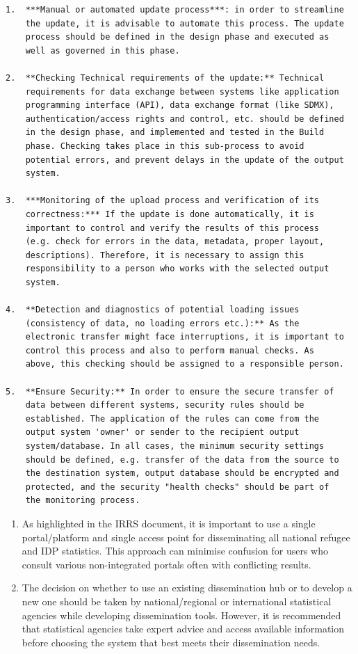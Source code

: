 \documentclass[
]{article}
\begin{document}
\begin{verbatim}
1.  ***Manual or automated update process***: in order to streamline
    the update, it is advisable to automate this process. The update
    process should be defined in the design phase and executed as
    well as governed in this phase.

2.  **Checking Technical requirements of the update:** Technical
    requirements for data exchange between systems like application
    programming interface (API), data exchange format (like SDMX),
    authentication/access rights and control, etc. should be defined
    in the design phase, and implemented and tested in the Build
    phase. Checking takes place in this sub-process to avoid
    potential errors, and prevent delays in the update of the output
    system.

3.  ***Monitoring of the upload process and verification of its
    correctness:*** If the update is done automatically, it is
    important to control and verify the results of this process
    (e.g. check for errors in the data, metadata, proper layout,
    descriptions). Therefore, it is necessary to assign this
    responsibility to a person who works with the selected output
    system.

4.  **Detection and diagnostics of potential loading issues
    (consistency of data, no loading errors etc.):** As the
    electronic transfer might face interruptions, it is important to
    control this process and also to perform manual checks. As
    above, this checking should be assigned to a responsible person.

5.  **Ensure Security:** In order to ensure the secure transfer of
    data between different systems, security rules should be
    established. The application of the rules can come from the
    output system 'owner' or sender to the recipient output
    system/database. In all cases, the minimum security settings
    should be defined, e.g. transfer of the data from the source to
    the destination system, output database should be encrypted and
    protected, and the security "health checks" should be part of
    the monitoring process.
\end{verbatim}

\begin{enumerate}
\def\labelenumi{\arabic{enumi}.}
\setcounter{enumi}{495}
\item
  As highlighted in the IRRS document, it is important to use a
  single portal/platform and single access point for disseminating all
  national refugee and IDP statistics. This approach can minimise
  confusion for users who consult various non-integrated portals often
  with conflicting results.
\item
  The decision on whether to use an existing dissemination hub or to
  develop a new one should be taken by national/regional or
  international statistical agencies while developing dissemination
  tools. However, it is recommended that statistical agencies take
  expert advice and access available information before choosing the
  system that best meets their dissemination needs.
\end{enumerate}
\end{document}
